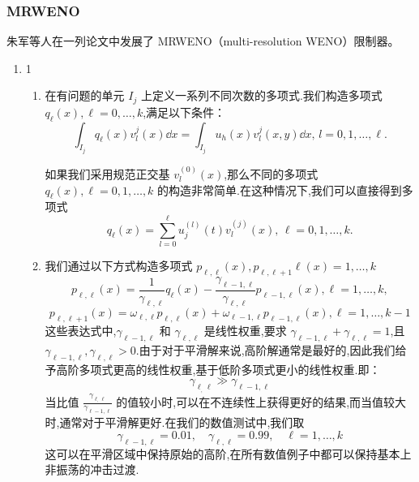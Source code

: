 \documentclass{book}
\begin{document}
\subsubsection{MRWENO}
朱军等人在一列论文\cite{MRWENO-1,MRWENO-2,MRWENO-3}中发展了 MRWENO（multi-resolution WENO）限制器。
\begin{enumerate}[label={{\bf Step \arabic*}:}]
  \item 1
        \begin{enumerate}[label={\bf Step 1.\arabic*.}]
          \item 在有问题的单元 $I_j$ 上定义一系列不同次数的多项式.我们构造多项式 $q_{\ell}(x), \ell=0, \ldots, k$,满足以下条件：
                \begin{equation}
                  \int_{I_j} q_{\ell}(x) v_{l}^{j}(x) \dd x=\int_{I_j} u_{h}(x) v_{l}^{j}(x, y) \dd x,\, l=0,1, \ldots, \ell.
                \end{equation}
                \begin{remark}
                  如果我们采用规范正交基 $v_{l}^{(0)}(x)$,那么不同的多项式 $q_{\ell}(x), \ell=0,1, \ldots, k$ 的构造非常简单.在这种情况下,我们可以直接得到多项式
                  \begin{equation}
                    q_{\ell}(x)=\sum_{l=0}^{\ell} u_{j}^{(l)}(t) v_{l}^{(j)}(x),\,\ell=0,1,\ldots, k.
                  \end{equation}
                \end{remark}
          \item 我们通过以下方式构造多项式 $p_{\ell, \ell}(x),p_{\ell,\ell+1} \ell(x)=1, \ldots, k$
                \begin{equation}
                  p_{\ell, \ell}(x)=\frac{1}{\gamma_{\ell, \ell}} q_{\ell}(x)-\frac{\gamma_{\ell-1, \ell}}{\gamma_{\ell, \ell}} p_{\ell-1, \ell}(x), \ell=1, \ldots, k,
                \end{equation}
                \begin{equation}
                  p_{\ell, \ell+1}(x)=\omega_{\ell, \ell} p_{\ell, \ell}(x)+\omega_{\ell-1, \ell} p_{\ell-1, \ell}(x), \ell=1, \ldots, k-1
                \end{equation}
                这些表达式中,$\gamma_{\ell-1, \ell}$ 和 $\gamma_{\ell, \ell}$ 是线性权重,要求 $\gamma_{\ell-1, \ell}+\gamma_{\ell, \ell}=1$,且 $\gamma_{\ell-1, \ell},\gamma_{\ell, \ell}>0$.由于对于平滑解来说,高阶解通常是最好的,因此我们给予高阶多项式更高的线性权重,基于低阶多项式更小的线性权重.即：
                \begin{equation}
                  \gamma_{\ell_,\ell} \gg \gamma_{\ell-1,\ell}
                \end{equation}
                当比值 $\frac{\gamma_{\ell_,\ell}}{\gamma_{\ell-1,\ell}}$ 的值较小时,可以在不连续性上获得更好的结果,而当值较大时,通常对于平滑解更好.在我们的数值测试中,我们取
                \begin{equation}
                  \gamma_{\ell-1, \ell}=0.01,\quad  \gamma_{\ell, \ell}=0.99,\quad \ell=1, \ldots, k
                \end{equation}
                这可以在平滑区域中保持原始的高阶,在所有数值例子中都可以保持基本上非振荡的冲击过渡.


\end{enumerate}
\end{enumerate}
\end{document}
